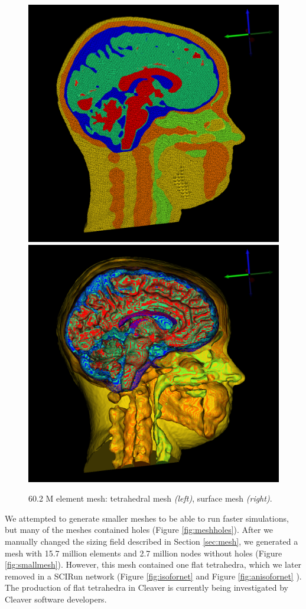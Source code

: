 \begin{figure}[H]
\begin{center}
\includegraphics[width=.49\textwidth]{Figures/bigmesh_1}
\includegraphics[width=.49\textwidth]{Figures/bigmesh_surface}
\caption{60.2 M element mesh: tetrahedral mesh \textit{(left)}, surface mesh \textit{(right)}.}
\label{fig:bigmesh}
\end{center}
\end{figure}

We attempted to generate smaller meshes to be able to run faster simulations, but many of the meshes contained holes (Figure \ref{fig:meshholes}). After we manually changed the sizing field described in Section \ref{sec:mesh}, we generated a mesh with 15.7 million elements and 2.7 million nodes without holes (Figure \ref{fig:smallmesh}). However, this mesh contained one flat tetrahedra, which we later removed in a SCIRun network (Figure \ref{fig:isofornet} and Figure \ref{fig:anisofornet} ). The production of flat tetrahedra in Cleaver is currently being investigated by Cleaver software developers.

